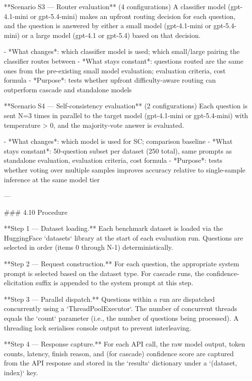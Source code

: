 **Scenario S3 — Router evaluation** (4 configurations)
A classifier model (gpt-4.1-mini or gpt-5.4-mini) makes an upfront routing decision for each question, and the question is answered by either a small model (gpt-4.1-mini or gpt-5.4-mini) or a large model (gpt-4.1 or gpt-5.4) based on that decision.

- *What changes*: which classifier model is used; which small/large pairing the classifier routes between
- *What stays constant*: questions routed are the same ones from the pre-existing small model evaluation; evaluation criteria, cost formula
- *Purpose*: tests whether upfront difficulty-aware routing can outperform cascade and standalone models

**Scenario S4 — Self-consistency evaluation** (2 configurations)
Each question is sent N=3 times in parallel to the target model (gpt-4.1-mini or gpt-5.4-mini) with temperature > 0, and the majority-vote answer is evaluated.

- *What changes*: which model is used for SC; comparison baseline
- *What stays constant*: 50-question subset per dataset (250 total), same prompts as standalone evaluation, evaluation criteria, cost formula
- *Purpose*: tests whether voting over multiple samples improves accuracy relative to single-sample inference at the same model tier

---

### 4.10 Procedure

**Step 1 — Dataset loading.** Each benchmark dataset is loaded via the HuggingFace `datasets` library at the start of each evaluation run. Questions are selected in order (items 0 through N-1) deterministically.

**Step 2 — Request construction.** For each question, the appropriate system prompt is selected based on the dataset type. For cascade runs, the confidence-elicitation suffix is appended to the system prompt at this step.

**Step 3 — Parallel dispatch.** Questions within a run are dispatched concurrently using a `ThreadPoolExecutor`. The number of concurrent threads equals the `count` parameter (i.e., the number of questions being processed). A threading lock serialises console output to prevent interleaving.

**Step 4 — Response capture.** For each API call, the raw model output, token counts, latency, finish reason, and (for cascade) confidence score are captured from the API response and stored in the `results` dictionary under a `(dataset, index)` key.

